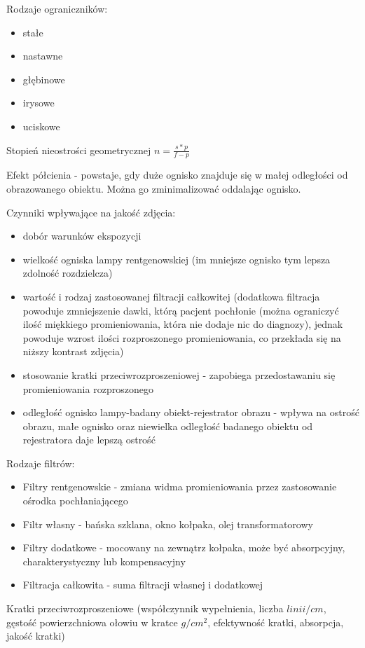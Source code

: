 \documentclass{article}
\begin{document}
Rodzaje ograniczników:
\begin{itemize}
    \item stałe
    \item nastawne
    \item głębinowe
    \item irysowe
    \item uciskowe
\end{itemize}

Stopień nieostrości geometrycznej $n = \frac{s*p}{f-p}$

Efekt półcienia - powstaje, gdy duże ognisko znajduje się w małej odległości od obrazowanego obiektu. Można go zminimalizować oddalając ognisko.

Czynniki wpływające na jakość zdjęcia:
\begin{itemize}
    \item dobór warunków ekspozycji
    \item wielkość ogniska lampy rentgenowskiej (im mniejsze ognisko tym lepsza zdolność rozdzielcza)
    \item wartość i rodzaj zastosowanej filtracji całkowitej (dodatkowa filtracja powoduje zmniejszenie dawki, którą pacjent pochłonie (można ograniczyć ilość miękkiego promieniowania, która nie dodaje nic do diagnozy), jednak powoduje wzrost ilości rozproszonego promieniowania, co przekłada się na niższy kontrast zdjęcia)
    \item stosowanie kratki przeciwrozproszeniowej - zapobiega przedostawaniu się promieniowania rozproszonego
    \item odległość ognisko lampy-badany obiekt-rejestrator obrazu - wpływa na ostrość obrazu, małe ognisko oraz niewielka odległość badanego obiektu od rejestratora daje lepszą ostrość
\end{itemize}

Rodzaje filtrów:
\begin{itemize}
    \item Filtry rentgenowskie - zmiana widma promieniowania przez zastosowanie ośrodka pochłaniającego
    \item Filtr własny - bańska szklana, okno kołpaka, olej transformatorowy
    \item Filtry dodatkowe - mocowany na zewnątrz kołpaka, może być absorpcyjny, charakterystyczny lub kompensacyjny
    \item Filtracja całkowita - suma filtracji własnej i dodatkowej 
\end{itemize}

Kratki przeciwrozproszeniowe (współczynnik wypełnienia, liczba $linii/cm$, gęstość powierzchniowa ołowiu w kratce $g/cm^2$, efektywność kratki, absorpcja, jakość kratki)
\end{document}
